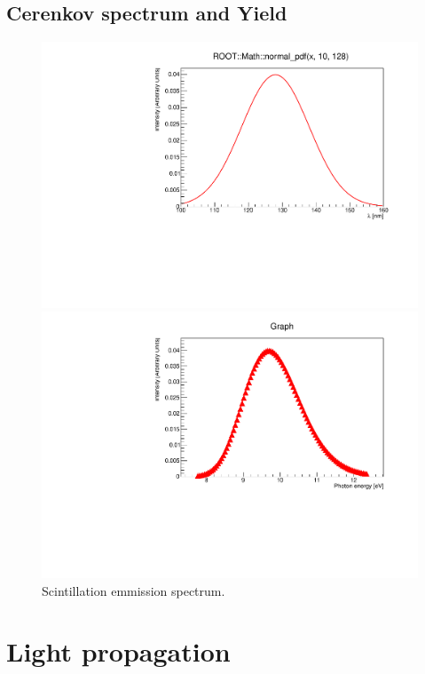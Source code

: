 \documentclass[a4paper]{jpconf}
\begin{document}
\subsection{Cerenkov spectrum and Yield}
\begin{figure}
\centering
\begin{minipage}{.5\textwidth}
  \centering
  \includegraphics[width=.7\linewidth]{spectrum.pdf}
\end{minipage}%
\begin{minipage}{.5\textwidth}
  \centering
  \includegraphics[width=.7\linewidth]{spectrumE.pdf}
\end{minipage}
\caption{\label{fig:spectrum}Scintillation emmission spectrum.}
\end{figure}

\section{Light propagation}
\end{document}
